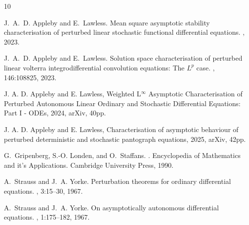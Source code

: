 \documentclass[10pt,reqno]{amsart}
\theoremstyle{definition}
\begin{document}
				
\begin{thebibliography}{10}
	
	J.~A.~D. Appleby and E.~Lawless.
	\newblock Mean square asymptotic stability characterisation of perturbed linear stochastic functional differential equations.
	, 2023.
	
	J.~A.~D. Appleby and E.~Lawless.
	\newblock Solution space characterisation of perturbed linear volterra integrodifferential convolution equations: The ${L}^p$ case.
	, 146:108825, 2023.
	
	J. A. D. Appleby and E. Lawless, Weighted L$^\infty$ Asymptotic Characterisation of Perturbed
	Autonomous Linear Ordinary and Stochastic Differential Equations: Part I - ODEs, 2024,
	arXiv, 40pp.
	
	J. A. D. Appleby and E. Lawless, Characterisation of asymptotic behaviour of perturbed deterministic and stochastic pantograph equations, 2025,
	arXiv, 42pp.
	
	G.~Gripenberg, S.-O. Londen, and O.~Staffans.
	.
	\newblock Encyclopedia of Mathematics and it's Applications. Cambridge University Press, 1990.
	
	A.~Strauss and J.~A. Yorke.
	\newblock Perturbation theorems for ordinary differential equations.
	, 3:15--30, 1967.
	
	A.~Strauss and J.~A. Yorke.
	\newblock On asymptotically autonomous differential equations.
	, 1:175--182, 1967.
\end{thebibliography}
\end{document}
